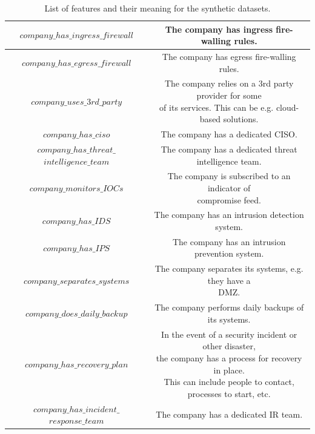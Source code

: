 \begin{center}
\begin{table}[h!]
{\begin{tabular}{|c|c|}
 		$company\_has\_ingress\_firewall$ & The company has ingress fire-walling rules. \\ \hline
 		$company\_has\_egress\_firewall$ & The company has egress fire-walling rules. \\ \hline
 		$company\_uses\_3rd\_party$ & \makecell{The company relies on a 3rd party provider for some \\ of its services. This can be e.g. cloud-based solutions.} \\ \hline
 		$company\_has\_ciso$ & The company has a dedicated CISO. \\ \hline
 		\makecell{$company\_has\_threat\_$\\$intelligence\_team$} & The company has a dedicated threat intelligence team. \\ \hline
 		$company\_monitors\_IOCs$ & \makecell{The company is subscribed to an indicator of \\ compromise feed.} \\ \hline
 		$company\_has\_IDS$ & The company has an intrusion detection system. \\ \hline
 		$company\_has\_IPS$ & The company has an intrusion prevention system. \\ \hline
 		$company\_separates\_systems$ & \makecell{The company separates its systems, e.g. they have a \\ DMZ. } \\ \hline
 		$company\_does\_daily\_backup$ & The company performs daily backups of its systems. \\ \hline
 		$company\_has\_recovery\_plan$ & \makecell{In the event of a security incident or other disaster, \\ the company has a process for recovery in place. \\ This can include people to contact, processes to start, etc.} \\ \hline
 		\makecell{$company\_has\_incident\_$\\$response\_team$} & The company has a dedicated IR team. \\ \hline
	\end{tabular}
	\caption{\label{table:features_meaning} List of features and their meaning for the synthetic datasets.}}
\end{table}\end{center}

